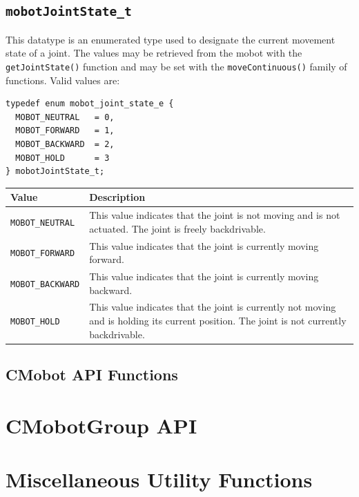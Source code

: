 \documentclass{article}
\begin{document}
\subsection{\label{sec:mobotJointState_t}\texttt{mobotJointState\_t}}
This datatype is an enumerated type used to designate the current 
movement state of a joint. The values may be retrieved from the 
mobot with the \texttt{getJointState()} function and may be set 
with the \texttt{moveContinuous()} family of functions. Valid values are:

\begin{verbatim}
typedef enum mobot_joint_state_e {
  MOBOT_NEUTRAL   = 0,
  MOBOT_FORWARD   = 1,
  MOBOT_BACKWARD  = 2,
  MOBOT_HOLD      = 3
} mobotJointState_t;
\end{verbatim}

\begin{tabular}{p{3.3cm}p{11.5cm}} \hline 
Value & Description \\
\hline
\texttt{MOBOT\_NEUTRAL}& This value indicates that the joint is not moving and is not actuated. The joint is freely backdrivable. \\
\texttt{MOBOT\_FORWARD}& This value indicates that the joint is currently moving forward. \\
\texttt{MOBOT\_BACKWARD}& This value indicates that the joint is currently moving backward. \\
\texttt{MOBOT\_HOLD}& This value indicates that the joint is currently not moving and is holding its current position. The joint is not currently backdrivable. \\
\hline
\end{tabular}

\subsection{\label{sec:cmobot_api}CMobot API Functions}


\section{\label{sec:cmobotgroup_api}CMobotGroup API}


\section{\label{sec:utility_functions}Miscellaneous Utility Functions}

\printindex
\end{document}
